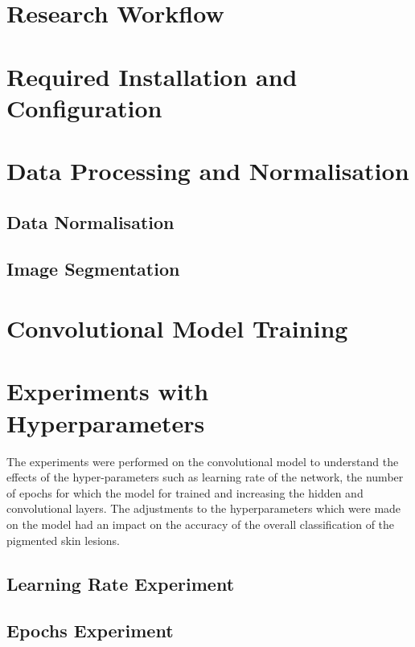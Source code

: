 \section{Research Workflow}

\section{Required Installation and Configuration}

\pagebreak
\section{Data Processing and Normalisation}

\subsection{Data Normalisation}

\subsection{ Image Segmentation }

\pagebreak
\section{Convolutional Model Training}


\pagebreak
\section{Experiments with Hyperparameters}
The experiments were performed on the convolutional model to understand the effects of the hyper-parameters 
such as learning rate of the network, the number of epochs for which the model for trained and increasing the hidden  
and convolutional layers. The adjustments to the hyperparameters which were made on the model had an impact on the accuracy of the overall classification of the pigmented skin lesions.
\subsection{Learning Rate Experiment}


\subsection{Epochs Experiment}

